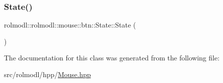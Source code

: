 \subsubsection{\texorpdfstring{State()}{State()}}
{\footnotesize\ttfamily rolmodl\+::rolmodl\+::mouse\+::btn\+::\+State\+::\+State (\begin{DoxyParamCaption}{ }\end{DoxyParamCaption})\hspace{0.3cm}{\ttfamily [noexcept]}}



The documentation for this class was generated from the following file\+:\begin{DoxyCompactItemize}
\item 
src/rolmodl/hpp/\mbox{\hyperlink{_mouse_8hpp}{Mouse.\+hpp}}\end{DoxyCompactItemize}
